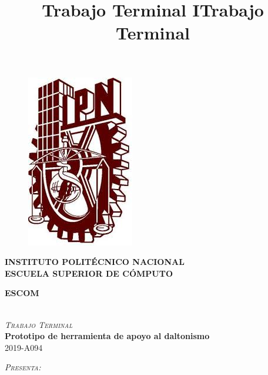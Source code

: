 \documentclass[10pt]{article}
\title{Trabajo Terminal I}
\title{Trabajo Terminal }
\begin{document}
\begin{center}																		%
\newcommand{\HRule}{\rule{\linewidth}{0.5mm}}									%

\begin{figure}[t]
\raggedright
\includegraphics[scale = 0.24]{Imagenes/IPN}
\end{figure}

\vspace*{-1.5 cm}								%
\textsc{\LARGE \bfseries INSTITUTO POLITÉCNICO NACIONAL }\\[0.5cm]	\textsc{\large \bfseries ESCUELA SUPERIOR DE CÓMPUTO}\\[1.5cm]


\begin{minipage}{0.9\textwidth} 
\begin{center}																					%
\textsc{\Large \bfseries ESCOM}
\end{center}
\end{minipage}\\[1.5cm]

\textsc{\large \itshape Trabajo Terminal}\\[0.4cm]

{ \huge \bfseries Prototipo de herramienta de apoyo al daltonismo}\\[0.4cm]	%

{ \large  2019-A094}\\[1.00cm] 																					%
																	

\begin{center}
\textsc{\Large \itshape Presenta:}\\[0.4cm]
\end{center}


\end{center}
\end{document}
